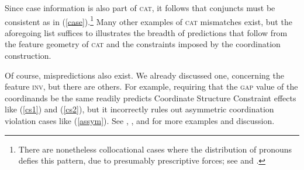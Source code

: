 \documentclass[output=paper]{langsci/langscibook}
\begin{document}
\noindent
Since case information is also part of \textsc{cat}, it follows that conjuncts must be consistent as in (\ref{case}).\footnote{There are nonetheless collocational cases where the distribution of pronouns defies this pattern, due to presumably prescriptive forces; see \citet{grano} and \citet{Lohmann2014a-u}.} Many other examples of \textsc{cat} mismatches exist, but the aforegoing list suffices to
illustrates the breadth of predictions that follow from the feature geometry of \textsc{cat} and the constraints imposed by
the coordination construction.

\begin{exe}
\ex
\begin{xlista}
\end{xlista}\label{case}
\end{exe}




Of course, mispredictions also exist. We already discussed one, concerning the feature \textsc{inv}, but there are others. For example, requiring that the \textsc{gap} value of the coordinands be the same readily predicts Coordinate Structure Constraint effects like 
(\ref{cs1}) and (\ref{cs2}), but it incorrectly rules out asymmetric coordination violation cases like (\ref{assym}). 
See \citet{goldsmith}, \citet{lakoff86}, and  \citet{levinprince86} for more examples and discussion.



\begin{exe}
\ex \begin{xlista}


\end{xlista}\label{cs1}
\end{exe}
\end{document}
